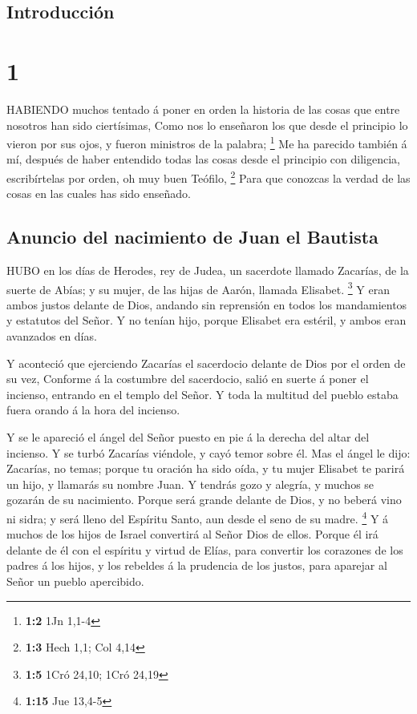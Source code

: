 \hypertarget{introducciuxf3n}{%
\subsection{Introducción}\label{introducciuxf3n}}

\hypertarget{section}{%
\section{1}\label{section}}

 HABIENDO muchos tentado á poner en orden la historia de las
cosas que entre nosotros han sido ciertísimas,  Como nos lo
enseñaron los que desde el principio lo vieron por sus ojos, y fueron
ministros de la palabra; \footnote{\textbf{1:2} 1Jn 1,1-4} 
Me ha parecido también á mí, después de haber entendido todas las cosas
desde el principio con diligencia, escribírtelas por orden, oh muy buen
Teófilo, \footnote{\textbf{1:3} Hech 1,1; Col 4,14}  Para
que conozcas la verdad de las cosas en las cuales has sido enseñado.

\hypertarget{anuncio-del-nacimiento-de-juan-el-bautista}{%
\subsection{Anuncio del nacimiento de Juan el
Bautista}\label{anuncio-del-nacimiento-de-juan-el-bautista}}

 HUBO en los días de Herodes, rey de Judea, un sacerdote
llamado Zacarías, de la suerte de Abías; y su mujer, de las hijas de
Aarón, llamada Elisabet. \footnote{\textbf{1:5} 1Cró 24,10; 1Cró 24,19}
 Y eran ambos justos delante de Dios, andando sin reprensión
en todos los mandamientos y estatutos del Señor.  Y no
tenían hijo, porque Elisabet era estéril, y ambos eran avanzados en
días.

 Y aconteció que ejerciendo Zacarías el sacerdocio delante
de Dios por el orden de su vez,  Conforme á la costumbre del
sacerdocio, salió en suerte á poner el incienso, entrando en el templo
del Señor.  Y toda la multitud del pueblo estaba fuera
orando á la hora del incienso.

 Y se le apareció el ángel del Señor puesto en pie á la
derecha del altar del incienso.  Y se turbó Zacarías
viéndole, y cayó temor sobre él.  Mas el ángel le dijo:
Zacarías, no temas; porque tu oración ha sido oída, y tu mujer Elisabet
te parirá un hijo, y llamarás su nombre Juan.  Y tendrás
gozo y alegría, y muchos se gozarán de su nacimiento. 
Porque será grande delante de Dios, y no beberá vino ni sidra; y será
lleno del Espíritu Santo, aun desde el seno de su madre. \footnote{\textbf{1:15}
  Jue 13,4-5}  Y á muchos de los hijos de Israel convertirá
al Señor Dios de ellos.  Porque él irá delante de él con el
espíritu y virtud de Elías, para convertir los corazones de los padres á
los hijos, y los rebeldes á la prudencia de los justos, para aparejar al
Señor un pueblo apercibido.

